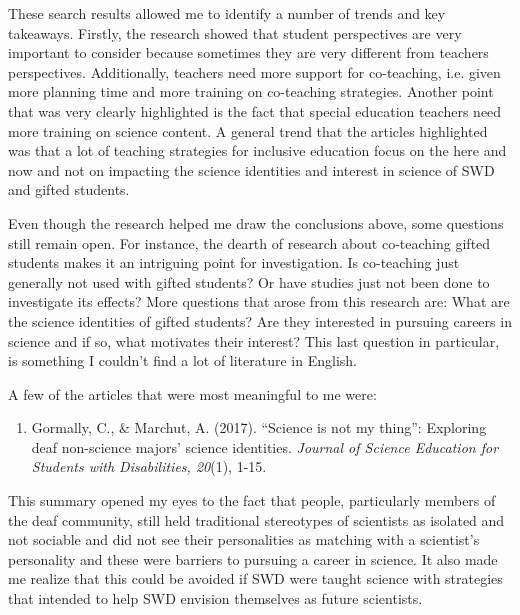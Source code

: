 \documentclass[11.5pt]{sig-alternate}
\begin{document}
\begin{large}
These search results allowed me to identify a number of trends and key takeaways. Firstly, the research showed that student perspectives are very important to consider because sometimes they are very different from teachers perspectives. Additionally, teachers need more support for co-teaching, i.e. given more planning time and more training on co-teaching strategies. Another point that was very clearly highlighted is the fact that special education teachers need more training on science content. A general trend that the articles highlighted was that a lot of teaching strategies for inclusive education focus on the here and now and not on impacting the science identities and interest in science of SWD and gifted students. 

Even though the research helped me draw the conclusions above, some questions still remain open. For instance, the dearth of research about co-teaching gifted students makes it an intriguing point for investigation. Is co-teaching just generally not used with gifted students? Or have studies just not been done to investigate its effects? More questions that arose from this research are: What are the science identities of gifted students? Are they interested in pursuing careers in science and if so, what motivates their interest? This last question in particular, is something I couldn't find a lot of literature in English.

A few of the articles that were most meaningful to me were:

\begin{enumerate}
    \item Gormally, C., \& Marchut, A. (2017). “Science is not my thing”: Exploring deaf non-science majors’ science identities. \textit{Journal of Science Education for Students with Disabilities, 20}(1), 1-15.
\end{enumerate}
This summary opened my eyes to the fact that people, particularly members of the deaf community, still held traditional stereotypes of scientists as isolated and not sociable and did not see their personalities as matching with a scientist’s personality and these were barriers to pursuing a career in science. It also made me realize that this could be avoided if SWD were taught science with strategies that intended to help SWD envision themselves as future scientists.


\end{large}
\end{document}
